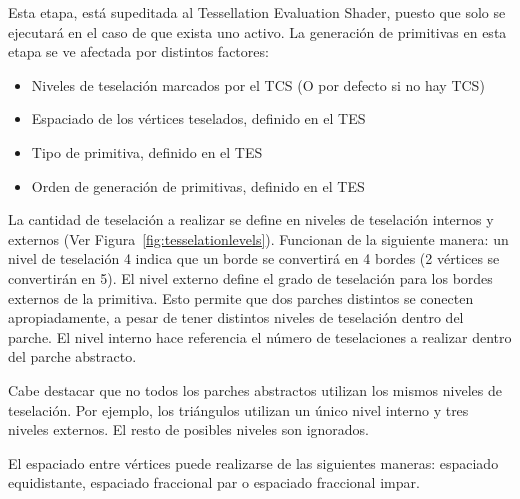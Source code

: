 Esta etapa, está supeditada al Tessellation Evaluation Shader, puesto que solo
se ejecutará en el caso de que exista uno activo. La generación de primitivas en
esta etapa se ve afectada por distintos factores:

\begin{itemize}
		\item Niveles de teselación marcados por el TCS (O por defecto si no hay
				TCS)
		\item Espaciado de los vértices teselados, definido en el TES
		\item Tipo de primitiva, definido en el TES
		\item Orden de generación de primitivas, definido en el TES
\end{itemize}

La cantidad de teselación a realizar se define en niveles de teselación internos
y externos (Ver Figura~\ref{fig:tesselationlevels}). Funcionan de la siguiente
manera: un nivel de teselación 4 indica que un borde se convertirá en 4 bordes
(2 vértices se convertirán en 5). El nivel externo define el grado de teselación
para los bordes externos de la primitiva. Esto permite que dos parches distintos
se conecten apropiadamente, a pesar de tener distintos niveles de teselación
dentro del parche. El nivel interno hace referencia el número de teselaciones a
realizar dentro del parche abstracto. 

Cabe destacar que no todos los parches abstractos utilizan los mismos niveles de
teselación. Por ejemplo, los triángulos utilizan un único nivel interno y tres
niveles externos. El resto de posibles niveles son ignorados. 

El espaciado entre vértices puede realizarse de las siguientes maneras:
espaciado equidistante, espaciado fraccional par o espaciado fraccional impar.

